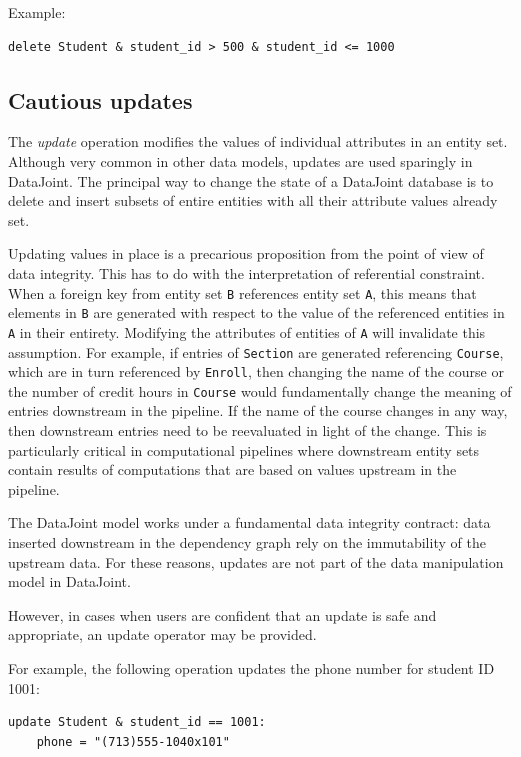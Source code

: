 \documentclass[letter,10pt]{article}
\newcommand{\datajoint}{DataJoint\xspace}
\begin{document}
Example: 
\begin{lstlisting}[language=dj]
delete Student & student_id > 500 & student_id <= 1000
\end{lstlisting}

\subsection{Cautious updates}
The \emph{update} operation modifies the values of individual attributes in an entity set.
Although very common in other data models, updates are used sparingly in \datajoint. 
The principal way to change the state of a \datajoint database is to delete and insert subsets of entire entities with all their attribute values already set. 

Updating values in place is a precarious proposition from the point of view of data integrity. 
This has to do with the interpretation of referential constraint.  
When a foreign key from entity set \lstinline$B$ references entity set \lstinline$A$, this means that elements in \lstinline$B$ are generated with respect to the value of the referenced entities in \lstinline$A$ in their entirety.  
Modifying the attributes of entities of \lstinline$A$ will invalidate this assumption.
For example, if entries of \lstinline$Section$ are generated referencing \lstinline$Course$, which are in turn referenced by \lstinline$Enroll$, then changing the name of the course or the number of credit hours in \lstinline$Course$ would fundamentally change the meaning of entries downstream in the pipeline.  
If the name of the course changes in any way, then downstream entries need to be reevaluated in light of the change.
This is particularly critical in computational pipelines where downstream entity sets contain results of computations that are based on values upstream in the pipeline.  

The \datajoint model works under a fundamental data integrity contract: data inserted downstream in the dependency graph rely on the immutability of the upstream data. 
For these reasons, updates are not part of the data manipulation model in \datajoint.

However, in cases when users are confident that an update is safe and appropriate, an update operator may be provided.

For example, the following operation updates the phone number for student ID 1001:
\begin{lstlisting}[language=dj]
update Student & student_id == 1001:
    phone = "(713)555-1040x101"
\end{lstlisting}
\end{document}
